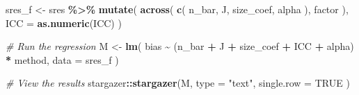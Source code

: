 \documentclass[
]{book}
\newenvironment{Shaded}{\begin{snugshade}}{\end{snugshade}}
\newcommand{\AttributeTok}[1]{\textcolor[rgb]{0.13,0.29,0.53}{#1}}
\newcommand{\CommentTok}[1]{\textcolor[rgb]{0.56,0.35,0.01}{\textit{#1}}}
\newcommand{\ConstantTok}[1]{\textcolor[rgb]{0.56,0.35,0.01}{#1}}
\newcommand{\FunctionTok}[1]{\textcolor[rgb]{0.13,0.29,0.53}{\textbf{#1}}}
\newcommand{\NormalTok}[1]{#1}
\newcommand{\OtherTok}[1]{\textcolor[rgb]{0.56,0.35,0.01}{#1}}
\newcommand{\SpecialCharTok}[1]{\textcolor[rgb]{0.81,0.36,0.00}{\textbf{#1}}}
\newcommand{\StringTok}[1]{\textcolor[rgb]{0.31,0.60,0.02}{#1}}
\begin{document}
\begin{Shaded}
\begin{Highlighting}[]
\NormalTok{sres\_f }\OtherTok{\textless{}{-}}
\NormalTok{  sres }\SpecialCharTok{\%\textgreater{}\%}
  \FunctionTok{mutate}\NormalTok{( }
    \FunctionTok{across}\NormalTok{( }\FunctionTok{c}\NormalTok{( n\_bar, J, size\_coef, alpha ), factor ),}
    \AttributeTok{ICC =} \FunctionTok{as.numeric}\NormalTok{(ICC)}
\NormalTok{  )}

\CommentTok{\# Run the regression}
\NormalTok{M }\OtherTok{\textless{}{-}} \FunctionTok{lm}\NormalTok{( bias }\SpecialCharTok{\textasciitilde{}}\NormalTok{ (n\_bar }\SpecialCharTok{+}\NormalTok{ J }\SpecialCharTok{+}\NormalTok{ size\_coef }\SpecialCharTok{+}\NormalTok{ ICC }\SpecialCharTok{+}\NormalTok{ alpha) }\SpecialCharTok{*}\NormalTok{ method, }
         \AttributeTok{data =}\NormalTok{ sres\_f )}

\CommentTok{\# View the results}
\NormalTok{stargazer}\SpecialCharTok{::}\FunctionTok{stargazer}\NormalTok{(M, }\AttributeTok{type =} \StringTok{"text"}\NormalTok{, }\AttributeTok{single.row =} \ConstantTok{TRUE}\NormalTok{ )}
\end{Highlighting}
\end{Shaded}
\end{document}
